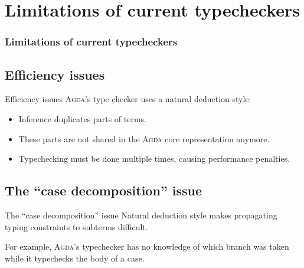 \documentclass[xcolor=svgnames,11pt]{beamer}
\newcommand{\agda}{\textsc{Agda}\xspace}
\begin{document}
\section{Limitations of current typecheckers}
\begin{frame}
  \frametitle{Limitations of current typecheckers}
  \tableofcontents[currentsection]
\end{frame}

\subsection{Efficiency issues}
\begin{frame}{Efficiency issues}
  \agda's type checker uses a natural deduction style:
  \begin{itemize}
  \item Inference duplicates parts of terms.
  \item These parts are not shared in the \agda core representation anymore.
  \item Typechecking must be done multiple times, causing performance penalties.
  \end{itemize}
  \begin{figure}
    \centering
  \end{figure}
\end{frame}

\subsection{The ``case decomposition'' issue}
\begin{frame}{The ``case decomposition'' issue}
  Natural deduction style makes propagating typing constraints to subterms difficult.

  For example, \agda's typechecker has no knowledge of which branch was taken while it typechecks the body of a case.
  \begin{center}
    \begin{minipage}{0.9\textwidth}
      
    \end{minipage}
  \end{center}
\end{frame}
\end{document}
